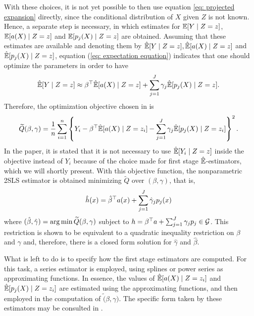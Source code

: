 With these choices, it is not yet possible to then use equation \ref{eq: projected expansion} directly, since the conditional distribution of $ X $ given $ Z $ is not known.
Hence, a separate step is necessary, in which estimates for $ \mathbb{E} [ Y \mid Z = z ] $, $ \mathbb{E} [ a ( X ) \mid Z = z ] $ and $ \mathbb{E} [ p_{ j } ( X ) \mid Z = z ] $ are obtained.
Assuming that these estimates are available and denoting them by $ \hat{ \mathbb{E} } [ Y \mid Z = z ], \hat{ \mathbb{E} } [ a ( X ) \mid Z = z ] $ and $ \hat{ \mathbb{E} } [ p_{ j } ( X ) \mid Z = z ] $, equation (\ref{eq: expectation equation}) indicates that one should optimize the parameters in order to have
\begin{equation*}
    \hat{ \mathbb{E} } [ Y \mid Z = z ] \approx \beta^{ \top } \hat{ \mathbb{E} } [ a ( X ) \mid Z = z ] + \sum_{ j=1 }^{ J } \gamma_{ j } \hat{ \mathbb{E} } [ p_{ j } ( X ) \mid Z = z ]
.\end{equation*}
Therefore, the optimization objective chosen in \cite{newey2003} is
\begin{equation}
    \label{eq: newey loss}
    \widetilde{Q} ( \beta, \gamma )
    = \frac{ 1 }{ n } \sum_{ i=1 }^{ n } \left\{ Y_{ i } - \beta^{ \top } \hat{ \mathbb{E} } [ a ( X ) \mid Z = z_{ i } ] - \sum_{ j=1 }^{ J } \gamma_{ j } \hat{ \mathbb{E} } [ p_{ j } ( X ) \mid Z = z_{ i } ] \right\}^2
.\end{equation}
In the paper, it is stated that it is not necessary to use $ \hat{ \mathbb{E} } [ Y_{ i } \mid Z = z ] $ inside the objective instead of $ Y_{ i } $ because of the choice made for first stage $ \hat{ \mathbb{E} } $-estimators, which we will shortly present.
With this objective function, the nonparametric 2SLS estimator is obtained minimizing $ \widetilde{Q} $ over $ ( \beta, \gamma ) $, that is,
\begin{equation}
    \label{eq: newey optimization problem}
    \hat{ h } ( x ) = \hat{ \beta }^{ \top } a ( x ) + \sum_{ j=1 }^{ J } \hat{ \gamma }_{ j } p_{ j } ( x )
\end{equation}
where $ ( \hat{ \beta }, \hat{ \gamma } ) = \operatorname*{arg\,min} \widetilde{Q} ( \beta, \gamma ) $ subject to $ h = \beta^{ \top } a + \sum_{ j=1 }^{ J } \gamma_{ j } p_{ j } \in \mathcal{G} $.
This restriction is shown to be equivalent to a quadratic inequality restriction on $ \beta $ and $ \gamma $ and, therefore, there is a closed form solution for $ \hat{ \gamma } $ and $ \hat{ \beta } $.

What is left to do is to specify how the first stage estimators are computed.
For this task, a series estimator is employed, using splines or power series as approximating functions.
In essence, the values of $ \hat { \mathbb{E} } [ a ( X ) \mid Z = z_{ i } ] $ and $ \hat{ \mathbb{E} } [ p_{ j } ( X ) \mid Z = z_{ i } ] $ are estimated using the approximating functions, and then employed in the computation of $ \widetilde ( \beta, \gamma ) $.
The specific form taken by these estimators may be consulted in \cite{newey2003}.

